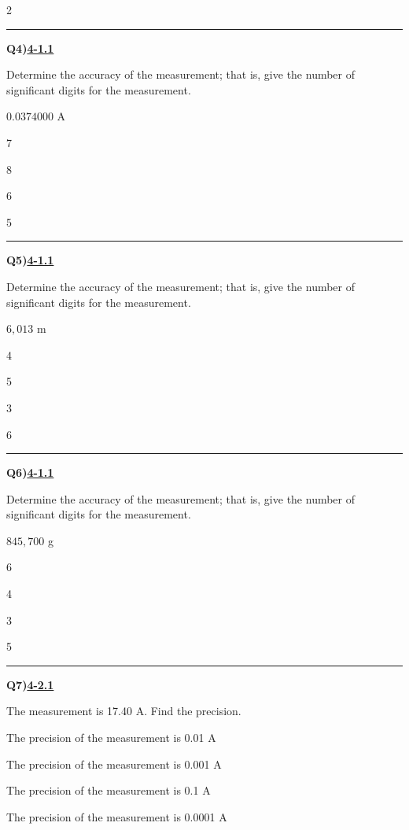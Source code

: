 \documentclass[11pt]{article}
\newenvironment{Qbox}[2]{%
  \par\medskip\noindent\begin{minipage}{\linewidth}%
  \hrule\medskip%
  \textbf{Q#1)}\hfill\textbf{\underline{#2}}\par\smallskip%
}{\par\end{minipage}\par\medskip}
\begin{document}
\begin{multicols}{2}
\begin{Qbox}{4}{4-1.1}
Determine the accuracy of the measurement; that is, give the number of significant digits for the measurement.\par\medskip $0.0374000$ A
\begin{choices}
  \item 7
  \item 8
  \item 6
  \item 5
\end{choices}
\end{Qbox}

\begin{Qbox}{5}{4-1.1}
Determine the accuracy of the measurement; that is, give the number of significant digits for the measurement.\par\medskip $6{,}013$ m
\begin{choices}
  \item 4
  \item 5
  \item 3
  \item 6
\end{choices}
\end{Qbox}

\begin{Qbox}{6}{4-1.1}
Determine the accuracy of the measurement; that is, give the number of significant digits for the measurement.\par\medskip $845{,}700$ g
\begin{choices}
  \item 6
  \item 4
  \item 3
  \item 5
\end{choices}
\end{Qbox}

\begin{Qbox}{7}{4-2.1}
The measurement is 17.40 A. Find the precision.
\begin{choices}
  \item The precision of the measurement is 0.01 A
  \item The precision of the measurement is 0.001 A
  \item The precision of the measurement is 0.1 A
  \item The precision of the measurement is 0.0001 A
\end{choices}
\end{Qbox}


\end{multicols}
\end{document}
